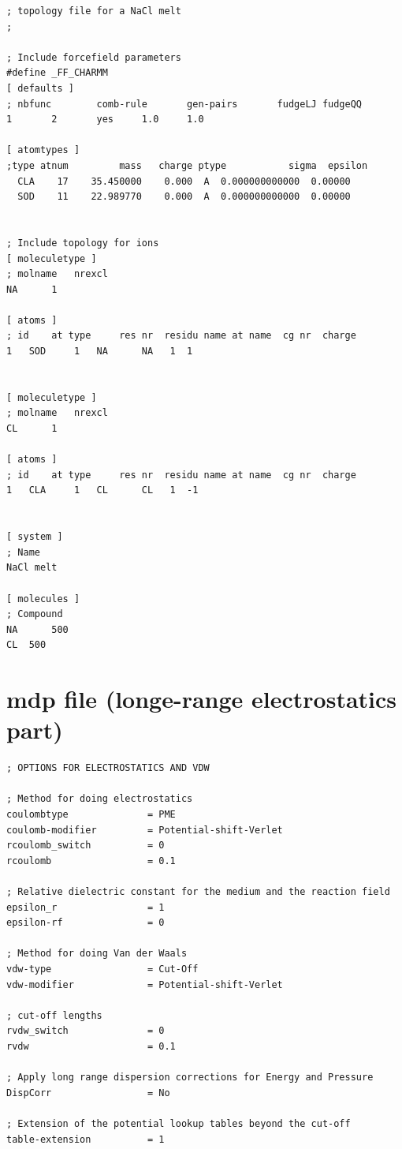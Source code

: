 \documentclass[11pt,twoside,a4paper]{report}
\begin{document}
\begin{appendices}
\begin{verbatim}
; topology file for a NaCl melt
;

; Include forcefield parameters
#define _FF_CHARMM
[ defaults ]
; nbfunc        comb-rule       gen-pairs       fudgeLJ fudgeQQ
1       2       yes     1.0     1.0

[ atomtypes ]
;type atnum         mass   charge ptype           sigma  epsilon
  CLA    17    35.450000    0.000  A  0.000000000000  0.00000
  SOD    11    22.989770    0.000  A  0.000000000000  0.00000


; Include topology for ions
[ moleculetype ]
; molname   nrexcl
NA      1

[ atoms ]
; id    at type     res nr  residu name at name  cg nr  charge   
1   SOD     1   NA      NA   1  1        


[ moleculetype ]
; molname   nrexcl
CL      1

[ atoms ]
; id    at type     res nr  residu name at name  cg nr  charge   
1   CLA     1   CL      CL   1  -1   


[ system ]
; Name
NaCl melt

[ molecules ]
; Compound
NA      500
CL	500 

\end{verbatim}




\section{mdp file (longe-range electrostatics part)}

\begin{verbatim}
; OPTIONS FOR ELECTROSTATICS AND VDW

; Method for doing electrostatics
coulombtype              = PME
coulomb-modifier         = Potential-shift-Verlet
rcoulomb_switch          = 0
rcoulomb                 = 0.1

; Relative dielectric constant for the medium and the reaction field
epsilon_r                = 1
epsilon-rf               = 0

; Method for doing Van der Waals
vdw-type                 = Cut-Off
vdw-modifier             = Potential-shift-Verlet

; cut-off lengths       
rvdw_switch              = 0
rvdw                     = 0.1

; Apply long range dispersion corrections for Energy and Pressure
DispCorr                 = No

; Extension of the potential lookup tables beyond the cut-off
table-extension          = 1


\end{verbatim}
\end{appendices}
\end{document}

